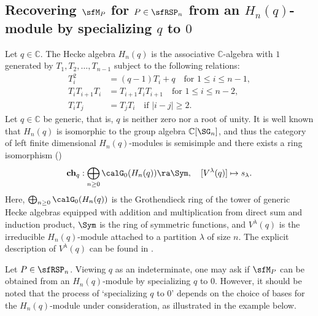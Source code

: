 \documentclass[12pt, reqno]{amsart}
\theoremstyle{definition}
\numberwithin{equation}{section} \numberwithin{figure}{section}
\numberwithin{table}{section}
\def\C{\mathbb C}
\begin{document}
\subsection{Recovering $\sfM_P$ for $P \in \sfRSP_n$ from an  $H_n(q)$-module by  specializing $q$ to $0$}\label{subsec: generic Hecke}
Let $q \in \C$.
The Hecke algebra $H_n(q)$ is the associative $\C$-algebra with $1$ generated by $T_1, T_2, \ldots, T_{n-1}$ subject to the following relations:
\begin{align*}
T_i^2 &= (q-1) T_i + q \quad \text{for $1\le i \le n-1$},\\
T_i T_{i+1} T_i &= T_{i+1} T_i T_{i+1}  \quad \text{for $1\le i \le n-2$},\\
T_i T_j &=T_j T_i \quad \text{if $|i-j| \ge 2$}.
\end{align*}
Let $q \in \C$ be generic,  that is,  $q$ is neither zero nor a root of unity.
It is well known that $H_n(q)$ is isomorphic to the group algebra $\C[\SG_n]$, and thus 
the category of left finite dimensional $H_n(q)$-modules is semisimple
and there exists a ring isomorphism (\cite[Section 3.2]{97KT})
\[
\textbf{ch}_q: \bigoplus_{n\ge 0} \calG_0(H_n(q))  \ra \Sym,
\quad
[V^\lambda(q)] \mapsto s_\lambda.
\]
Here, $\bigoplus_{n\ge 0} \calG_0(H_n(q))$ is the Grothendieck ring of the tower   of generic Hecke algebras equipped with addition and multiplication from direct sum and induction product,
$\Sym$ is the ring of symmetric functions, and $V^\lambda(q)$ is the irreducible $H_n(q)$-module attached to a partition $\lambda$ of size $n$.
The explicit description of $V^{\lambda}(q)$ can be found in \cite[p.7]{92KW}.

Let $P \in \sfRSP_n$.
Viewing $q$ as an indeterminate, one may ask if 
$\sfM_P$ can be obtained from an $H_n(q)$-module by specializing $q$ to $0$.
However, it should be noted that the process of `specializing 
$q$ to 
$0$' depends on the choice of bases for the
$H_n(q)$-module under consideration, as illustrated in the example below.
\end{document}
